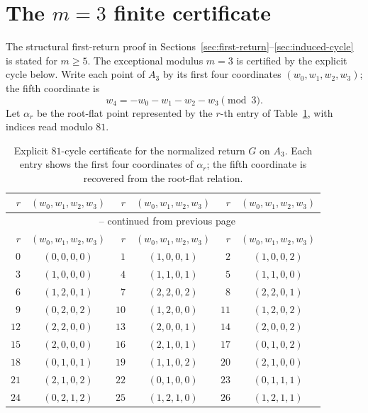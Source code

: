 \documentclass[11pt]{article}
\theoremstyle{definition}
\begin{document}
\section{The \texorpdfstring{\(m=3\)}{m=3} finite certificate}\label{app:m3certificate}

The structural first-return proof in Sections~\ref{sec:first-return}--\ref{sec:induced-cycle} is
stated for \(m\ge5\).  The exceptional modulus \(m=3\) is certified by the explicit cycle below.  Write
each point of \(A_3\) by its first four coordinates \((w_0,w_1,w_2,w_3)\); the fifth coordinate is
\[
w_4=-w_0-w_1-w_2-w_3\pmod 3.
\]
Let \(\alpha_r\) be the root-flat point represented by the \(r\)-th entry of
Table~\ref{tab:m3cycle}, with indices read modulo \(81\).

\begingroup
\small
\begin{longtable}{r@{\;}c@{\qquad}r@{\;}c@{\qquad}r@{\;}c}
\caption{Explicit \(81\)-cycle certificate for the normalized return \(G\) on \(A_3\).  Each entry
shows the first four coordinates of \(\alpha_r\); the fifth coordinate is recovered from the root-flat
relation.}\label{tab:m3cycle}\\
\toprule
\(r\) & \((w_0,w_1,w_2,w_3)\) & \(r\) & \((w_0,w_1,w_2,w_3)\) & \(r\) & \((w_0,w_1,w_2,w_3)\) \\
\midrule
\endfirsthead
\multicolumn{6}{c}{\tablename\ \thetable{} -- continued from previous page}\\
\toprule
\(r\) & \((w_0,w_1,w_2,w_3)\) & \(r\) & \((w_0,w_1,w_2,w_3)\) & \(r\) & \((w_0,w_1,w_2,w_3)\) \\
\midrule
\endhead
\(0\) & \((0,0,0,0)\) & \(1\) & \((1,0,0,1)\) & \(2\) & \((1,0,0,2)\) \\
\(3\) & \((1,0,0,0)\) & \(4\) & \((1,1,0,1)\) & \(5\) & \((1,1,0,0)\) \\
\(6\) & \((1,2,0,1)\) & \(7\) & \((2,2,0,2)\) & \(8\) & \((2,2,0,1)\) \\
\(9\) & \((0,2,0,2)\) & \(10\) & \((1,2,0,0)\) & \(11\) & \((1,2,0,2)\) \\
\(12\) & \((2,2,0,0)\) & \(13\) & \((2,0,0,1)\) & \(14\) & \((2,0,0,2)\) \\
\(15\) & \((2,0,0,0)\) & \(16\) & \((2,1,0,1)\) & \(17\) & \((0,1,0,2)\) \\
\(18\) & \((0,1,0,1)\) & \(19\) & \((1,1,0,2)\) & \(20\) & \((2,1,0,0)\) \\
\(21\) & \((2,1,0,2)\) & \(22\) & \((0,1,0,0)\) & \(23\) & \((0,1,1,1)\) \\
\(24\) & \((0,2,1,2)\) & \(25\) & \((1,2,1,0)\) & \(26\) & \((1,2,1,1)\) \\

\end{longtable}
\end{document}
